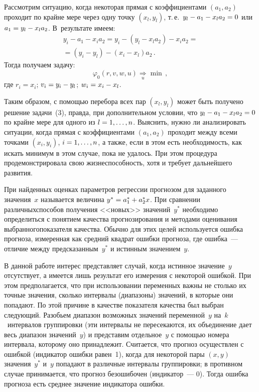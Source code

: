 \begin{multicols}{2}
Рассмотрим ситуацию, когда некоторая прямая с
коэффициентами $(a_1,a_2)$ проходит по крайне мере через одну точку
$(x_l,y_l)$, т.\,е.\ $y_l\hm-a_1\hm- x_la_2\hm=0$ или $a_1\hm= y_l\hm- x_la_2$.
В~результате имеем:
\begin{multline*}
y_i- a_1  - x_ia_2 = y_i - (y_l- x_la_2)
 - x_ia_2={}\\
 {}= (y_i - y_l)- (x_i- x_l)a_2\,.
 \end{multline*}
  Тогда получаем задачу:
     $$
     \varphi_0(r,v,w,u)\underset{u}{\Rightarrow} \min\,,
     $$
где $r_i = x_i$; $v_i\hm= y_i\hm-y_l$;  $w_i\hm= x_i\hm-x_l$.

     Таким образом, с помощью перебора всех пар $(x_l,y_l)$ может быть
получено решение задачи~(3), правда, при дополнительном условии, что
$y_l\hm- a_1\hm- x_la_2\hm=0$ по крайне мере для одного из $l\hm= 1,\ldots ,n$.
Выяснить, нужно ли анализировать ситуации, когда прямая с коэффициентами
$(a_1,a_2)$ проходит между всеми точками $(x_i,y_i)$, $i\hm= 1,\ldots ,n$, а
также, если в этом есть необходимость, как искать минимум в этом случае,
пока не удалось. При этом процедура продемонстрировала свою
жизнеспособность, хотя и требует дальнейшего развития.

     При найденных оценках параметров регрессии прогнозом для заданного
значения~$x$ называется величина $y^*\hm= a_1^*\hm+ a_2^*x$. При
сравнении различных\linebreak способов получения <<новых>> значений~$y^*$
необходимо определиться с понятием качества прогнозирования и методами
оценивания выбранного\linebreak показате\-ля качества. Обычно для этих целей
используется ошибка прогноза, измеренная как средний квадрат ошибки
прогноза, где ошибка~---\linebreak отличие между предсказанным~$y^*$ и истинным
значени\-ем~$y$.

     В данной работе интерес представляет случай, когда истинное
значение~$y$ отсутствует, а имеется лишь результат его измерения с некоторой
ошибкой. При этом предполагается, что при использовании переменных важны
не столько их точные значения, сколько интервалы (диапазоны) значений, в
которые они попадают. По этой причине в качестве показателя качества был
выбран следующий. Разобьем диапазон возможных значений переменной~$y$
на~$k$~интервалов группировки (эти интервалы не пересекаются, их
объединение дает весь диапазон значений~$y$) и представим отдельное~$y$ с
помощью номера интервала, которому оно принадлежит. Считается, что
прогноз осуществлен с ошибкой (индикатор ошибки равен~1), когда для
некоторой пары $(x,y)$ значения~$y^*$ и~$y$ попадают в различные
интервалы группировки; в противном случае принимается, что прогноз
безошибочен (индикатор~--- 0). Тогда ошибка прогноза есть среднее значение
индикатора ошибки.


\end{multicols}

